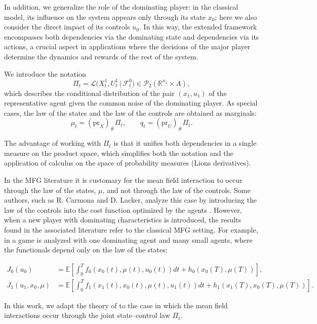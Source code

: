 \documentclass[12pt]{article}
\theoremstyle{definition}
\begin{document}
In addition, we generalize the role of the dominating player: in the classical model, its influence on the system appears only through its state \(x_0\); here we also consider the direct impact of its controls \(u_0\). In this way, the extended framework encompasses both dependencies via the dominating state and dependencies via its actions, a crucial aspect in applications where the decisions of the major player determine the dynamics and rewards of the rest of the system.

We introduce the notation
\[
\Pi_t = \mathcal{L}\big(X_t^1, U_t^1 \,\big|\, \mathcal{F}_t^0\big)\in\mathcal{P}_2(\mathbb{R}^{n_1}\times A),
\]
which describes the conditional distribution of the pair \((x_1,u_1)\) of the representative agent given the common noise of the dominating player. As special cases, the law of the states and the law of the controls are obtained as marginals:
\[
\mu_t = (\mathrm{pr}_X)_{\#}\Pi_t,
\qquad
q_t = (\mathrm{pr}_U)_{\#}\Pi_t.
\]

The advantage of working with $\Pi_t$ is that it unifies both dependencies in a single measure on the product space, which simplifies both the notation and the application of calculus on the space of probability measures (Lions derivatives).

In the MFG literature it is customary for the mean field interaction to occur through the law of the states, $\mu$, and not through the law of the controls. Some authors, such as R. Carmona and D. Lacker, analyze this case by introducing the law of the controls into the cost function optimized by the agents \cite{carmona2015weakmfgformulation}. However, when a new player with dominating characteristics is introduced, the results found in the associated literature refer to the classical MFG setting. For example, in \cite{bensoussan2014mfgdominating} a game is analyzed with one dominating agent and many small agents, where the functionals depend only on the law of the states:

\begin{align*}
    J_0(u_0) &= \mathbb{E} \left[ \int_0^T f_0 \left( x_0(t), \mu(t), u_0(t) \right) dt + h_0 \left( x_0(T), \mu(T) \right) \right], \\
    J_1(u_1, x_0, \mu) &= \mathbb{E} \left[ \int_0^T f_1 \left( x_1(t), x_0(t), \mu(t), u_1(t) \right) dt + h_1 \left( x_1(T), x_0(T), \mu(T) \right) \right].
\end{align*}

In this work, we adapt the theory of \cite{bensoussan2014mfgdominating} to the case in which the mean field interactions occur through the joint state--control law $\Pi_t$.
\end{document}
